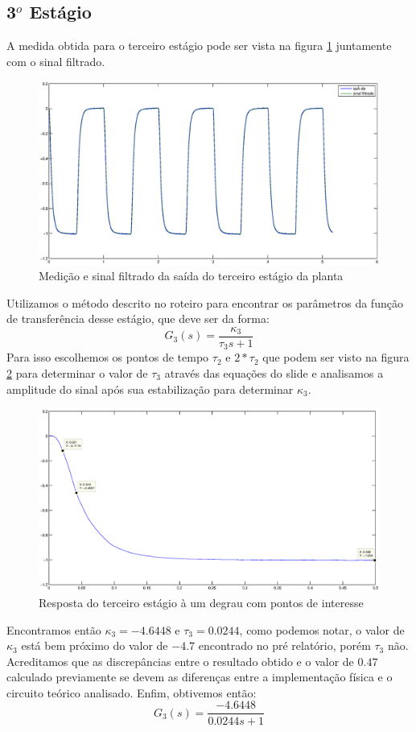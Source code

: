 \documentclass{article}
\begin{document}
\subsection{3$^o$ Estágio}
A medida obtida para o terceiro estágio pode ser vista na figura \ref{fig:saida3} juntamente com o sinal filtrado.
\begin{figure}[H]
	\centering
	\includegraphics[width=\linewidth]{saida3}
	\caption{Medição e sinal filtrado da saída do terceiro estágio da planta}
	\label{fig:saida3}
\end{figure}
Utilizamos o método descrito no roteiro \cite{bb:roteiro} para encontrar os parâmetros da função de transferência desse estágio, que deve ser da forma:
\begin{equation}
\label{eq:gs3}
G_3(s) = \frac{\kappa_3}{\tau_3 s + 1}
\end{equation}
Para isso escolhemos os pontos de tempo $\tau_2$ e $2*\tau_2$ que podem ser visto na figura \ref{fig:3seila} para determinar o valor de $\tau_3$ através das equações do slide e analisamos a amplitude do sinal após sua estabilização para determinar $\kappa_3$.
\begin{figure}[H]
	\centering
	\includegraphics[width=\linewidth]{3seila}
	\caption{Resposta do terceiro estágio à um degrau com pontos de interesse}
	\label{fig:3seila}
\end{figure}
Encontramos então $\kappa_3 = -4.6448$ e $\tau_3 = 0.0244$, como podemos notar, o valor de $\kappa_3$ está bem próximo do valor de $-4.7$ encontrado no pré relatório, porém $\tau_3$ não. Acreditamos que as discrepâncias entre o resultado obtido e o valor de $0.47$ calculado previamente se devem as diferenças entre a implementação física e o circuito teórico analisado.
Enfim, obtivemos então:
\begin{equation}
\label{eq:g3}
G_3(s) = \frac{-4.6448}{0.0244 s + 1}
\end{equation}
\end{document}
